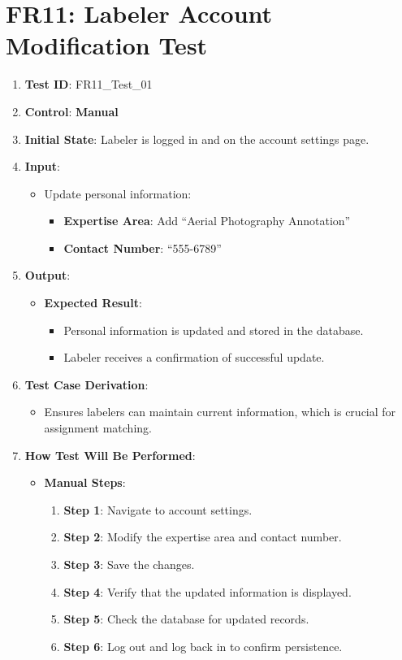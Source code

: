 \documentclass[12pt, titlepage]{article}
\begin{document}
\section*{FR11: Labeler Account Modification Test}

\begin{enumerate}
    \item \textbf{Test ID}: FR11\_Test\_01
    \item \textbf{Control}: \textbf{Manual}
    \item \textbf{Initial State}: Labeler is logged in and on the account settings page.
    \item \textbf{Input}:
    \begin{itemize}
        \item Update personal information:
        \begin{itemize}
            \item \textbf{Expertise Area}: Add ``Aerial Photography Annotation''
            \item \textbf{Contact Number}: ``555-6789''
        \end{itemize}
    \end{itemize}
    \item \textbf{Output}:
    \begin{itemize}
        \item \textbf{Expected Result}:
        \begin{itemize}
            \item Personal information is updated and stored in the database.
            \item Labeler receives a confirmation of successful update.
        \end{itemize}
    \end{itemize}
    \item \textbf{Test Case Derivation}:
    \begin{itemize}
        \item Ensures labelers can maintain current information, which is crucial for assignment matching.
    \end{itemize}
    \item \textbf{How Test Will Be Performed}:
    \begin{itemize}
        \item \textbf{Manual Steps}:
        \begin{enumerate}
            \item \textbf{Step 1}: Navigate to account settings.
            \item \textbf{Step 2}: Modify the expertise area and contact number.
            \item \textbf{Step 3}: Save the changes.
            \item \textbf{Step 4}: Verify that the updated information is displayed.
            \item \textbf{Step 5}: Check the database for updated records.
            \item \textbf{Step 6}: Log out and log back in to confirm persistence.
        \end{enumerate}
    \end{itemize}
\end{enumerate}
\end{document}
